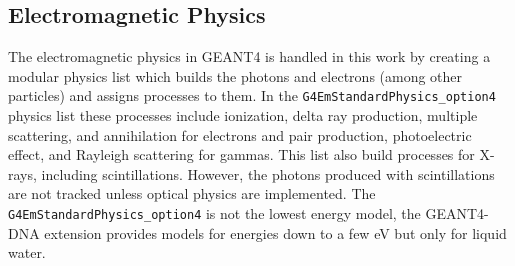 \subsection{Electromagnetic Physics}
The electromagnetic physics in GEANT4 is handled in this work by creating a modular physics list which builds the photons and electrons (among other particles) and assigns processes to them.
In the \verb+G4EmStandardPhysics_option4+ physics list these processes include ionization, delta ray production, multiple scattering, and annihilation for electrons and pair production, photoelectric effect, and Rayleigh scattering for gammas.
This list also build processes for X-rays, including scintillations. 
However, the photons produced with scintillations are not tracked unless optical physics are implemented.
The \verb+G4EmStandardPhysics_option4+ is not the lowest energy model, the GEANT4-DNA extension provides models for energies down to a few eV but only for liquid water.

